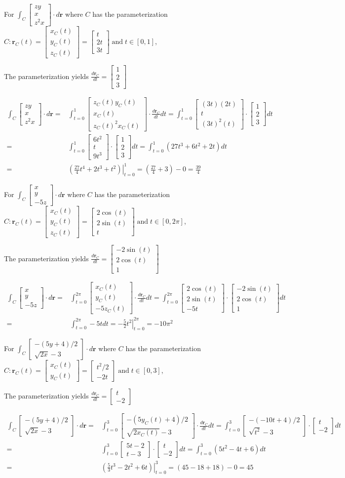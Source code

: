 \documentclass{article}
\newcommand{\colxyvec}[2]{\begin{bmatrix} #1 \\ #2 \end{bmatrix}}
\newcommand{\colvec}[3]{\begin{bmatrix} #1 \\ #2 \\ #3 \end{bmatrix}}
\newcommand{\at}[1]{\left. #1 \right|}
\newcommand{\dr}[1]{\textcolor{dark_red}{#1}}
\begin{document}
\begin{framed}
\dr{For \(\int_C \colvec{zy}{x}{z^2x} \cdot d\mathbf{r}\) where \(C\) has the parameterization \(C: \mathbf{r}_C(t) = \colvec{x_C(t)}{y_C(t)}{z_C(t)} = \colvec{t}{2t}{3t} \;\text{and}\; t \in [0,1]\),}

\dr{The parameterization yields \(\frac{d\mathbf{r}_C}{dt} = \colvec{1}{2}{3}\)}

\dr{\begin{align*}
\int_C \colvec{zy}{x}{z^2x} \cdot d\mathbf{r} = & \int_{t = 0}^1 \colvec{z_C(t) y_C(t)}{x_C(t)}{z_C(t)^2 x_C(t)} \cdot \frac{d\mathbf{r}_C}{dt}dt 
= \int_{t = 0}^1 \colvec{(3t)(2t)}{t}{(3t)^2(t)} \cdot \colvec{1}{2}{3}dt \\
= & \int_{t = 0}^1 \colvec{6t^2}{t}{9t^3} \cdot \colvec{1}{2}{3}dt 
= \int_{t = 0}^1 (27t^3 + 6t^2 + 2t)dt \\
= & \at{(\frac{27}{4}t^4 + 2t^3 + t^2)}_{t = 0}^1 
= (\frac{27}{4} + 3) - 0 
= \frac{39}{4}
\end{align*}}
\end{framed}

\pagebreak

\begin{framed}
\dr{For \(\int_C \colvec{x}{y}{-5z} \cdot d\mathbf{r}\) where \(C\) has the parameterization \(C: \mathbf{r}_C(t) = \colvec{x_C(t)}{y_C(t)}{z_C(t)} = \colvec{2\cos(t)}{2\sin(t)}{t} \;\text{and}\; t \in [0,2\pi]\),}

\dr{The parameterization yields \(\frac{d\mathbf{r}_C}{dt} = \colvec{-2\sin(t)}{2\cos(t)}{1}\)}

\dr{\begin{align*}
\int_C \colvec{x}{y}{-5z} \cdot d\mathbf{r} = & \int_{t=0}^{2\pi} \colvec{x_C(t)}{y_C(t)}{-5z_C(t)} \cdot \frac{d\mathbf{r}_C}{dt}dt    
= \int_{t=0}^{2\pi} \colvec{2\cos(t)}{2\sin(t)}{-5t} \cdot \colvec{-2\sin(t)}{2\cos(t)}{1}dt \\   
= & \int_{t=0}^{2\pi} -5t dt 
= \at{-\frac{5}{2}t^2}_{t=0}^{2\pi}  
= -10\pi^2
\end{align*}}
\end{framed}

\begin{framed}
\dr{For \(\int_C \colxyvec{-(5y + 4)/2}{\sqrt{2x} - 3} \cdot d\mathbf{r}\) where \(C\) has the parameterization \(C: \mathbf{r}_C(t) = \colxyvec{x_C(t)}{y_C(t)} = \colxyvec{t^2 / 2}{-2t} \;\text{and}\; t \in [0,3]\),}

\dr{The parameterization yields \(\frac{d\mathbf{r}_C}{dt} = \colxyvec{t}{-2}\)}

\dr{\begin{align*}
\int_C \colxyvec{-(5y + 4)/2}{\sqrt{2x} - 3} \cdot d\mathbf{r} = & \int_{t=0}^3 \colxyvec{-(5y_C(t) + 4)/2}{\sqrt{2x_C(t)} - 3} \cdot \frac{d\mathbf{r}_C}{dt}dt 
= \int_{t=0}^3 \colxyvec{-(-10t + 4)/2}{\sqrt{t^2} - 3} \cdot \colxyvec{t}{-2}dt \\
= & \int_{t=0}^3 \colxyvec{5t - 2}{t - 3} \cdot \colxyvec{t}{-2}dt 
= \int_{t=0}^3 (5t^2 - 4t + 6)dt \\  
= & \at{(\frac{5}{3}t^3 - 2t^2 + 6t)}_{t=0}^3 
= (45 - 18 + 18) - 0 = 45
\end{align*}}
\end{framed}
\end{document}
